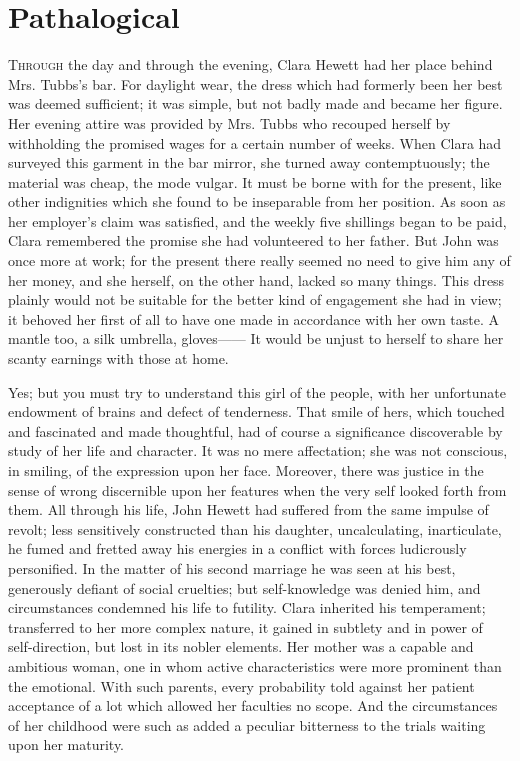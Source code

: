 \chapter{Pathalogical}

\textsc{Through} the day and through the evening, Clara Hewett had her
place behind Mrs. Tubbs's bar. For daylight wear, the dress which had
formerly been her best was deemed sufficient; it was simple, but not
badly made and became her figure. Her evening attire was provided by
Mrs. Tubbs who recouped herself by withholding the promised wages for a
certain number of weeks. When Clara had surveyed this garment in the bar
mirror, she turned away contemptuously; the material was cheap, the mode
vulgar. It must be borne with for the present, like other indignities
which she found to be inseparable from her position. As soon as her
employer's claim was satisfied, and the weekly five shillings began to
be paid, Clara remembered {}the promise she had volunteered to her
father. But John was once more at work; for the present there really
seemed no need to give him any of her money, and she herself, on the
other hand, lacked so many things. This dress plainly would not be
suitable for the better kind of engagement she had in view; it behoved
her first of all to have one made in accordance with her own taste. A
mantle too, a silk umbrella, gloves{{------}} It would be unjust to
herself to share her scanty earnings with those at home.

Yes; but you must try to understand this girl of the people, with her
unfortunate endowment of brains and defect of tenderness. That smile of
hers, which touched and fascinated and made thoughtful, had of course a
significance discoverable by study of her life and character. It was no
mere affectation; she was not conscious, in smiling, of the expression
upon her face. Moreover, there was justice in the sense of wrong
discernible upon her features when the very self looked forth from them.
All through his life, John {}Hewett had suffered from the same impulse
of revolt; less sensitively constructed than his daughter,
uncalculating, inarticulate, he fumed and fretted away his energies in a
conflict with forces ludicrously personified. In the matter of his
second marriage he was seen at his best, generously defiant of social
cruelties; but self-knowledge was denied him, and circumstances
condemned his life to futility. Clara inherited his temperament;
transferred to her more complex nature, it gained in subtlety and in
power of self-direction, but lost in its nobler elements. Her mother was
a capable and ambitious woman, one in whom active characteristics were
more prominent than the emotional. With such parents, every probability
told against her patient acceptance of a lot which allowed her faculties
no scope. And the circumstances of her childhood were such as added a
peculiar bitterness to the trials waiting upon her maturity.

